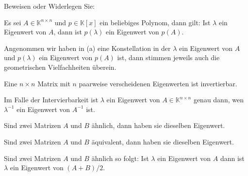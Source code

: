 \begin{Problem}
	Beweisen oder Widerlegen Sie:
	\begin{parts}
		\item Es sei $A\in \mathbb{K}^{n\times n}$ und $p\in\mathbb{K}[x]$ ein beliebiges Polynom, dann gilt: Ist $\lambda$ ein Eigenwert von $A$, dann ist $p(\lambda)$ ein Eigenwert von $p(A)$.
		\item Angenommen wir haben in (a) eine Konstellation in der $\lambda$ ein Eigenwert von $A$ und $p(\lambda)$ ein Eigenwert von $p(A)$ ist, dann stimmen jeweils auch die geometrischen Vielfachheiten überein.  
		\item Eine $n\times n$ Matrix mit $n$ paarweise verscheidenen Eigenwerten ist invertierbar.
		\item Im Falle der Intervierbarkeit ist $\lambda$ ein Eigenwert von $A\in \mathbb{K}^{n\times n}$ genau dann, wen $\lambda^{-1}$ ein Eigenwert von $A^{-1}$ ist.
		\item Sind zwei Matrizen $A$ und $B$ ähnlich, dann haben sie dieselben Eigenwert.
		\item Sind zwei Matrizen $A$ und $B$ äquivalent, dann haben sie dieselben Eigenwert.
		\item Sind zwei Matrizen $A$ und $B$ ähnlich so folgt: Ist $\lambda$ ein Eigenwert von $A$ dann ist $\lambda$ ein Eigenwert von $(A + B) / 2$.
	\end{parts}
\end{Problem}

